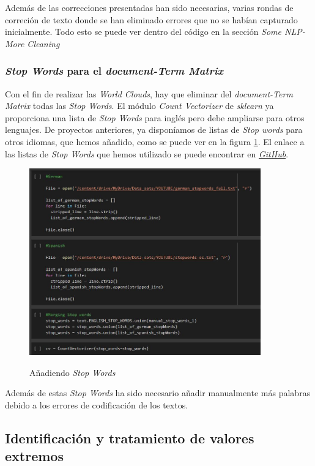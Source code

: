 \documentclass[a4paper,12pt]{article}
\begin{document}
Adem\'as de las correcciones presentadas han sido necesarias, varias rondas de correci\'on de texto donde se han eliminado errores que no se hab\'ian capturado inicialmente. Todo esto se puede ver dentro del c\'odigo en la secci\'on {\itshape Some NLP-More Cleaning}

\subsubsection{{\itshape Stop Words} para el {\itshape document-Term Matrix}}

Con el fin de realizar las {\itshape World Clouds}, hay que eliminar del {\itshape document-Term Matrix} todas las {\itshape Stop Words}. El m\'odulo {\itshape Count Vectorizer} de {\itshape sklearn} ya proporciona una lista de {\itshape Stop Words} para ingl\'es pero debe ampliarse para otros lenguajes. De proyectos anteriores, ya dispon\'iamos de listas de {\itshape Stop words} para otros idiomas, que hemos a\~nadido, como se puede ver en la figura \ref{fig:stop}. El enlace a las listas de {\itshape Stop Words} que hemos utilizado se puede encontrar en \href{https://github.com/b-suarez/youtube_stats_analysis/blob/main/Pickle_and_other_data/data_and\%20objects.txt}{{\itshape GitHub}}.

\begin{figure}[h!]
\centering
\includegraphics[width=10cm]{Stop_words.JPG}\\
\caption{A\~nadiendo {\itshape Stop Words}}
\label{fig:stop}
\end{figure}

Adem\'as de estas {\itshape Stop Words} ha sido necesario a\~nadir manualmente m\'as palabras debido a los errores de codificaci\'on de los textos.

\subsection{Identificaci\'on y tratamiento de valores extremos}
\end{document}
